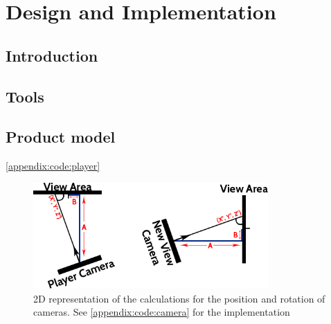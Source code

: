 \chapter[Product]{Design and Implementation}
\label{design}

\begin{multicols*}{2}

	\section{Introduction}

	\section{Tools}


	\section{Product model}
		\autoref{appendix:code:player}

\end{multicols*}

	\begin{figure}[h]
		\label{design:fig:maths}
		\includegraphics[width=0.8\textwidth]{Images/Position}
		\centering
		\caption{2D representation of the calculations for the position and rotation of cameras.
			See \autoref{appendix:code:camera} for the implementation}
	\end{figure}

